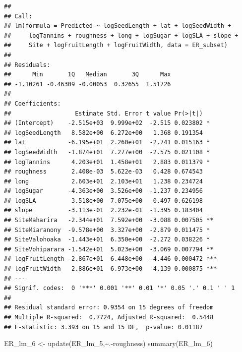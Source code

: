 \documentclass[
  12pt,
]{article}
\newenvironment{Shaded}{\begin{snugshade}}{\end{snugshade}}
\newcommand{\FunctionTok}[1]{\textcolor[rgb]{0.00,0.00,0.00}{#1}}
\newcommand{\NormalTok}[1]{#1}
\newcommand{\OtherTok}[1]{\textcolor[rgb]{0.56,0.35,0.01}{#1}}
\newcommand{\SpecialCharTok}[1]{\textcolor[rgb]{0.00,0.00,0.00}{#1}}
\begin{document}
\begin{verbatim}
## 
## Call:
## lm(formula = Predicted ~ logSeedLength + lat + logSeedWidth + 
##     logTannins + roughness + long + logSugar + logSLA + slope + 
##     Site + logFruitLength + logFruitWidth, data = ER_subset)
## 
## Residuals:
##      Min       1Q   Median       3Q      Max 
## -1.10261 -0.46309 -0.00053  0.32655  1.51726 
## 
## Coefficients:
##                  Estimate Std. Error t value Pr(>|t|)    
## (Intercept)    -2.515e+03  9.999e+02  -2.515 0.023802 *  
## logSeedLength   8.582e+00  6.272e+00   1.368 0.191354    
## lat            -6.195e+01  2.260e+01  -2.741 0.015163 *  
## logSeedWidth   -1.874e+01  7.277e+00  -2.575 0.021108 *  
## logTannins      4.203e+01  1.458e+01   2.883 0.011379 *  
## roughness       2.408e-03  5.622e-03   0.428 0.674543    
## long            2.603e+01  2.103e+01   1.238 0.234724    
## logSugar       -4.363e+00  3.526e+00  -1.237 0.234956    
## logSLA          3.518e+00  7.075e+00   0.497 0.626198    
## slope          -3.113e-01  2.232e-01  -1.395 0.183404    
## SiteMaharira   -2.344e+01  7.592e+00  -3.088 0.007505 ** 
## SiteMiaranony  -9.578e+00  3.327e+00  -2.879 0.011475 *  
## SiteValohoaka  -1.443e+01  6.350e+00  -2.272 0.038226 *  
## SiteVohiparara -1.542e+01  5.023e+00  -3.069 0.007794 ** 
## logFruitLength -2.867e+01  6.448e+00  -4.446 0.000472 ***
## logFruitWidth   2.886e+01  6.973e+00   4.139 0.000875 ***
## ---
## Signif. codes:  0 '***' 0.001 '**' 0.01 '*' 0.05 '.' 0.1 ' ' 1
## 
## Residual standard error: 0.9354 on 15 degrees of freedom
## Multiple R-squared:  0.7724, Adjusted R-squared:  0.5448 
## F-statistic: 3.393 on 15 and 15 DF,  p-value: 0.01187
\end{verbatim}

\begin{Shaded}
\begin{Highlighting}[]
\NormalTok{ER\_lm\_6 }\OtherTok{\textless{}{-}} \FunctionTok{update}\NormalTok{(ER\_lm\_5,}\SpecialCharTok{\textasciitilde{}}\NormalTok{.}\SpecialCharTok{{-}}\NormalTok{roughness)}
\FunctionTok{summary}\NormalTok{(ER\_lm\_6)}
\end{Highlighting}
\end{Shaded}
\end{document}
